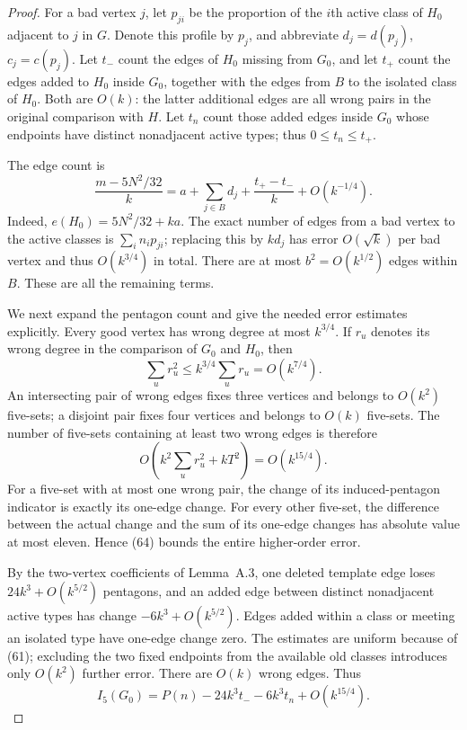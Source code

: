 \begin{proof}
For a bad vertex $j$, let $p_{ji}$ be the proportion of the $i$th active
class of $H_0$ adjacent to $j$ in $G$. Denote this profile by $p_j$, and
abbreviate $d_j=d(p_j)$, $c_j=c(p_j)$. Let $t_-$ count the edges of $H_0$
missing from $G_0$, and let $t_+$ count the edges added to $H_0$ inside
$G_0$, together with the edges from $B$ to the isolated class of $H_0$.
Both are $O(k)$: the latter additional edges are all wrong pairs in the
original comparison with $H$. Let $t_n$ count those added edges inside
$G_0$ whose endpoints have distinct nonadjacent active types; thus
$0\leq t_n\leq t_+$.

The edge count is
\begin{equation}\tag{63}\label{eq:phase-edge-count}
 \frac{m-5N^2/32}{k}
 =a+\sum_{j\in B}d_j+\frac{t_+-t_-}{k}+O(k^{-1/4}).
\end{equation}
Indeed, $e(H_0)=5N^2/32+ka$. The exact number of edges from a bad
vertex to the active classes is $\sum_i n_i p_{ji}$; replacing this by
$kd_j$ has error $O(\sqrt{k})$ per bad vertex and thus $O(k^{3/4})$ in
total. There are at most $b^2=O(k^{1/2})$ edges within $B$. These are all
the remaining terms.

We next expand the pentagon count and give the needed error estimates
explicitly. Every good vertex has wrong degree at most $k^{3/4}$. If
$r_u$ denotes its wrong degree in the comparison of $G_0$ and $H_0$, then
\[
 \sum_u r_u^2\leq k^{3/4}\sum_u r_u=O(k^{7/4}).
\]
An intersecting pair of wrong edges fixes three vertices and belongs to
$O(k^2)$ five-sets; a disjoint pair fixes four vertices and belongs to
$O(k)$ five-sets. The number of five-sets containing at least two wrong
edges is therefore
\begin{equation}\tag{64}\label{eq:wrong-pair-error}
 O\left(k^2\sum_u r_u^2+kT^2\right)=O(k^{15/4}).
\end{equation}
For a five-set with at most one wrong pair, the change of its
induced-pentagon indicator is exactly its one-edge change. For every
other five-set, the difference between the actual change and the sum of
its one-edge changes has absolute value at most eleven. Hence (64)
bounds the entire higher-order error.

By the two-vertex coefficients of Lemma~A.3, one deleted template edge
loses $24k^3+O(k^{5/2})$ pentagons, and an added edge between distinct
nonadjacent active types has change $-6k^3+O(k^{5/2})$. Edges added
within a class or meeting an isolated type have one-edge change zero.
The estimates are uniform because of (61); excluding the two fixed
endpoints from the available old classes introduces only $O(k^2)$
further error. There are $O(k)$ wrong edges. Thus
\begin{equation}\tag{65}\label{eq:good-pentagons}
 I_5(G_0)=P(n)-24k^3t_--6k^3t_n+O(k^{15/4}).
\end{equation}


\end{proof}
